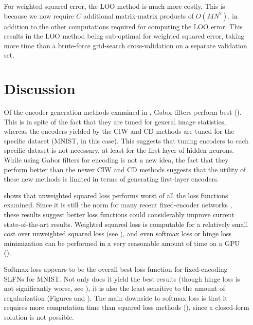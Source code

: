 For weighted squared error, the LOO method is much more costly.
This is because we now require $C$ additional matrix-matrix products of $O(MN^2)$,
in addition to the other computations required for computing the LOO error.
This results in the LOO method being sub-optimal for weighted squared error,
taking more time than a brute-force grid-search cross-validation
on a separate validation set.


\section{Discussion}

Of the encoder generation methods examined in ,
Gabor filters perform best ().
This is in spite of the fact that they are tuned for general image statistics,
whereas the encoders yielded by the CIW and CD methods
are tuned for the specific dataset (MNIST, in this case).
This suggests that tuning encoders to each specific dataset is not necessary,
at least for the first layer of hidden neurons.
While using Gabor filters for encoding is not a new idea,
the fact that they perform better than the newer CIW and CD methods
suggests that the utility of these new methods is limited
in terms of generating first-layer encoders.

 shows that unweighted squared loss performs worst
of all the loss functions examined.
Since it is still the norm
for many recent fixed-encoder networks \parencite[\eg/][]{McDonnell2015},
these results suggest better loss functions could considerably improve
current state-of-the-art results.
Weighted squared loss is computable for a relatively small cost
over unweighted squared loss (see ),
and even softmax loss or hinge loss minimization can be performed
in a very reasonable amount of time on a GPU ().

Softmax loss appears to be the overall best loss function
for fixed-encoding SLFNs for MNIST.
Not only does it yield the best results
(though hinge loss is not significantly worse, see ),
it is also the least sensitive to the amount of regularization
(Figures  and ).
The main downside to softmax loss is that
it requires more computation time than squared loss methods
(),
since a closed-form solution is not possible.

